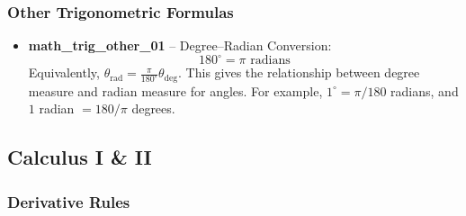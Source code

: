 \documentclass[11pt,a4paper]{article}
\begin{document}
\subsubsection{Other Trigonometric Formulas}

\begin{itemize}
\item \textbf{math\_trig\_other\_01} -- Degree--Radian Conversion: 
\[180^\circ = \pi \text{ radians}\]
Equivalently, $\theta_{\text{rad}} = \frac{\pi}{180^\circ}\theta_{\text{deg}}$. This gives the relationship between degree measure and radian measure for angles. For example, $1^\circ = \pi/180$ radians, and $1$ radian $= 180/\pi$ degrees.
\end{itemize}

\subsection{Calculus I \& II}

\subsubsection{Derivative Rules}
\end{document}
